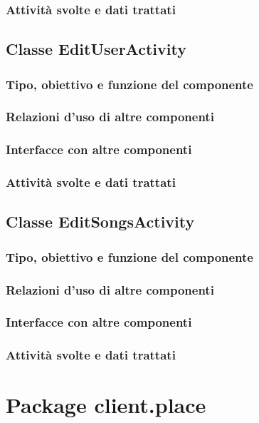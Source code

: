 \subsubsection*{Attivit\`a svolte e dati trattati}

\subsection{Classe EditUserActivity}
\subsubsection*{Tipo, obiettivo e funzione del componente}
\subsubsection*{Relazioni d'uso di altre componenti}
\subsubsection*{Interfacce con altre componenti}
\subsubsection*{Attivit\`a svolte e dati trattati}

\subsection{Classe EditSongsActivity}
\subsubsection*{Tipo, obiettivo e funzione del componente}
\subsubsection*{Relazioni d'uso di altre componenti}
\subsubsection*{Interfacce con altre componenti}
\subsubsection*{Attivit\`a svolte e dati trattati}

\newpage
\section{Package client.place} %
